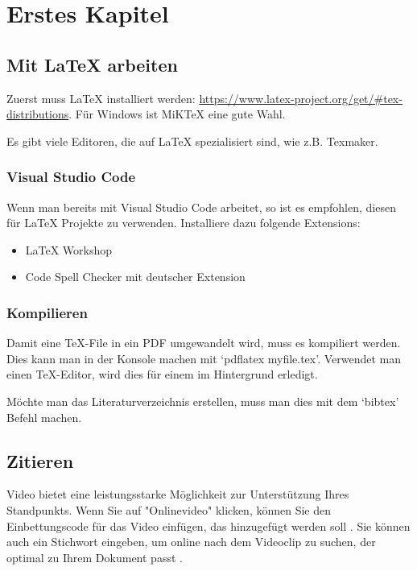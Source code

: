 
\section{Erstes Kapitel}

\subsection{Mit LaTeX arbeiten}

Zuerst muss LaTeX installiert werden: \url{https://www.latex-project.org/get/#tex-distributions}. Für Windows ist MiKTeX eine gute Wahl.

Es gibt viele Editoren, die auf LaTeX spezialisiert sind, wie z.B. Texmaker.

\subsubsection{Visual Studio Code}

Wenn man bereits mit Visual Studio Code arbeitet, so ist es empfohlen, diesen für LaTeX Projekte zu verwenden. Installiere dazu folgende Extensions:
\begin{itemize}
    \vspace{-\topsep}
    \item LaTeX Workshop
    \item Code Spell Checker mit deutscher Extension
\end{itemize}


\subsubsection{Kompilieren}

Damit eine TeX-File in ein PDF umgewandelt wird, muss es kompiliert werden. Dies kann man in der Konsole machen mit `pdflatex myfile.tex'. Verwendet man einen TeX-Editor, wird dies für einem im Hintergrund erledigt.

Möchte man das Literaturverzeichnis erstellen, muss man dies mit dem `bibtex' Befehl machen.

\subsection{Zitieren}

Video bietet eine leistungsstarke Möglichkeit zur Unterstützung Ihres Standpunkts. Wenn Sie auf "Onlinevideo" klicken, können Sie den Einbettungscode für das Video einfügen, das hinzugefügt werden soll \cite{Aabkabla2019}. Sie können auch ein Stichwort eingeben, um online nach dem Videoclip zu suchen, der optimal zu Ihrem Dokument passt \cite{Lamport1986}.

